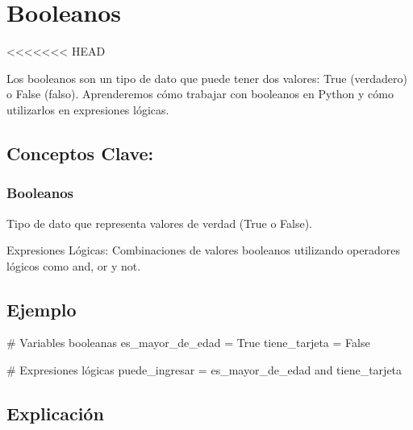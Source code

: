\documentclass[
  a4paper,
  onepage,
  openany]{scrreprt}
\newenvironment{Shaded}{\begin{snugshade}}{\end{snugshade}}
\newcommand{\CommentTok}[1]{\textcolor[rgb]{0.37,0.37,0.37}{#1}}
\newcommand{\KeywordTok}[1]{\textcolor[rgb]{0.00,0.23,0.31}{#1}}
\newcommand{\NormalTok}[1]{\textcolor[rgb]{0.00,0.23,0.31}{#1}}
\newcommand{\OperatorTok}[1]{\textcolor[rgb]{0.37,0.37,0.37}{#1}}
\newcommand{\VariableTok}[1]{\textcolor[rgb]{0.07,0.07,0.07}{#1}}
\begin{document}
\hypertarget{booleanos}{%
\chapter{Booleanos}\label{booleanos}}

\textless\textless\textless\textless\textless\textless\textless{} HEAD

Los booleanos son un tipo de dato que puede tener dos valores: True
(verdadero) o False (falso). Aprenderemos cómo trabajar con booleanos en
Python y cómo utilizarlos en expresiones lógicas.

\hypertarget{conceptos-clave-26}{%
\section{Conceptos Clave:}\label{conceptos-clave-26}}

\hypertarget{booleanos-1}{%
\subsection{Booleanos}\label{booleanos-1}}

Tipo de dato que representa valores de verdad (True o False).

Expresiones Lógicas: Combinaciones de valores booleanos utilizando
operadores lógicos como and, or y not.

\hypertarget{ejemplo-26}{%
\section{Ejemplo}\label{ejemplo-26}}

\begin{Shaded}
\begin{Highlighting}[]
\CommentTok{\# Variables booleanas}
\NormalTok{es\_mayor\_de\_edad }\OperatorTok{=} \VariableTok{True}
\NormalTok{tiene\_tarjeta }\OperatorTok{=} \VariableTok{False}

\CommentTok{\# Expresiones lógicas}
\NormalTok{puede\_ingresar }\OperatorTok{=}\NormalTok{ es\_mayor\_de\_edad }\KeywordTok{and}\NormalTok{ tiene\_tarjeta}
\end{Highlighting}
\end{Shaded}

\hypertarget{explicaciuxf3n-26}{%
\section{Explicación}\label{explicaciuxf3n-26}}
\end{document}
